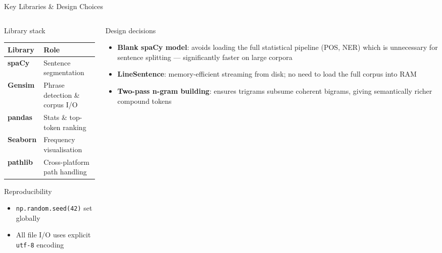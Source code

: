 \documentclass[11pt,aspectratio=169,professionalfonts]{beamer}
\begin{document}
%
\begin{frame}{Key Libraries \& Design Choices}
\small
  \begin{columns}[T]
    \begin{column}{0.48\textwidth}
      \begin{block}{Library stack}
        \begin{tabular}{ll}
          \toprule
          Library & Role \\
          \midrule
          \textbf{spaCy}   & Sentence segmentation \\
          \textbf{Gensim}  & Phrase detection \& corpus I/O \\
          \textbf{pandas}  & Stats \& top-token ranking \\
          \textbf{Seaborn} & Frequency visualisation \\
          \textbf{pathlib} & Cross-platform path handling \\
          \bottomrule
        \end{tabular}
      \end{block}
      \begin{block}{Reproducibility}
        \begin{itemize}
          \item \texttt{np.random.seed(42)} set globally
          \item All file I/O uses explicit \texttt{utf-8}
                encoding
        \end{itemize}
      \end{block}
    \end{column}
    \begin{column}{0.48\textwidth}
      \begin{block}{Design decisions}
        \begin{itemize}
          \item \textbf{Blank spaCy model}: avoids loading
                the full statistical pipeline (POS, NER)
                which is unnecessary for sentence splitting
                — significantly faster on large corpora
          \item \textbf{LineSentence}: memory-efficient
                streaming from disk; no need to load the
                full corpus into RAM
          \item \textbf{Two-pass n-gram building}: ensures
                trigrams subsume coherent bigrams, giving
                semantically richer compound tokens
        \end{itemize}
      \end{block}
    \end{column}
  \end{columns}

\end{frame}
\end{document}

